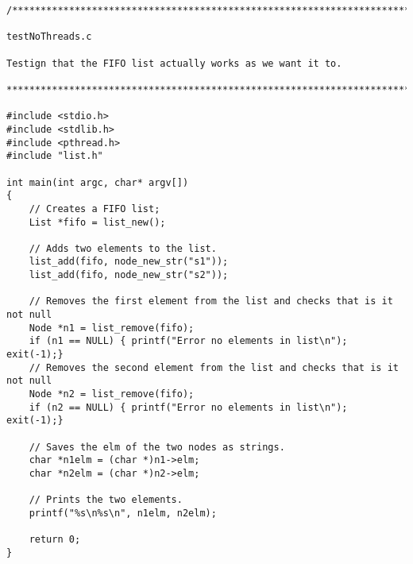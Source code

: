 \begin{lstlisting}
/******************************************************************************

testNoThreads.c

Testign that the FIFO list actually works as we want it to.

******************************************************************************/

#include <stdio.h>
#include <stdlib.h>
#include <pthread.h>
#include "list.h"

int main(int argc, char* argv[])
{
    // Creates a FIFO list;
    List *fifo = list_new();

    // Adds two elements to the list.
    list_add(fifo, node_new_str("s1"));
    list_add(fifo, node_new_str("s2"));

    // Removes the first element from the list and checks that is it not null
    Node *n1 = list_remove(fifo);
    if (n1 == NULL) { printf("Error no elements in list\n"); exit(-1);}
    // Removes the second element from the list and checks that is it not null
    Node *n2 = list_remove(fifo);
    if (n2 == NULL) { printf("Error no elements in list\n"); exit(-1);}

    // Saves the elm of the two nodes as strings.
    char *n1elm = (char *)n1->elm;
    char *n2elm = (char *)n2->elm;

    // Prints the two elements.
    printf("%s\n%s\n", n1elm, n2elm);

    return 0;
}
\end{lstlisting}